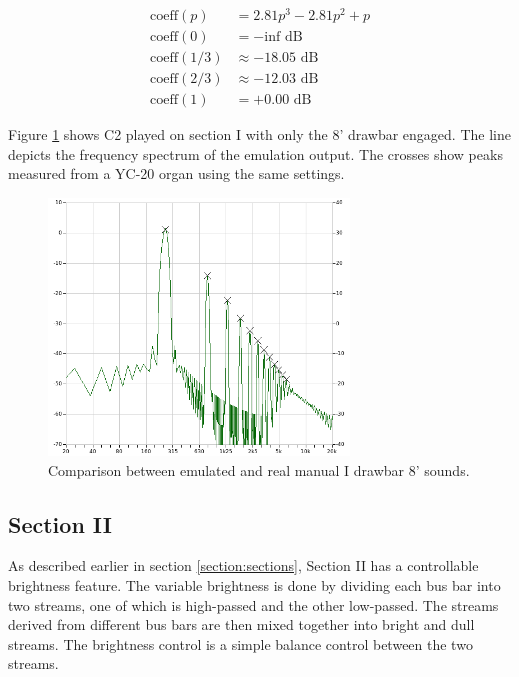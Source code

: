 \documentclass[11pt,a4paper]{article}
\begin{document}
\begin{equation}
\label{eq:levertransfer}
\begin{split}
\mbox{coeff}(p) &= 2.81 p^3 - 2.81 p^2 + p \\
\mbox{coeff}(0) &= -\mbox{inf} \mbox{ dB}\\
\mbox{coeff}(1/3) &\approx -18.05 \mbox{ dB}\\
\mbox{coeff}(2/3) &\approx -12.03 \mbox{ dB}\\
\mbox{coeff}(1) &= +0.00 \mbox{ dB}
\end{split}
\end{equation}

Figure \ref{fig:comp_manual_i} shows C2 played on section I with only the 8' drawbar engaged. The line depicts the frequency spectrum of the emulation output. The crosses show peaks measured from a YC-20 organ using the same settings.

\begin{figure}[tbp]
\centering
\includegraphics[width=80mm]{analysis/manual_i_compare.png}
\caption{Comparison between emulated and real manual I drawbar 8' sounds.}
\label{fig:comp_manual_i}
\end{figure}



\subsection{Section II}

As described earlier in section \ref{section:sections}, Section II has a controllable brightness feature. The variable brightness is done by dividing each bus bar into two streams, one of which is high-passed and the other low-passed. The streams derived from different bus bars are then mixed together into bright and dull streams. The brightness control is a simple balance control between the two streams. 
\end{document}
